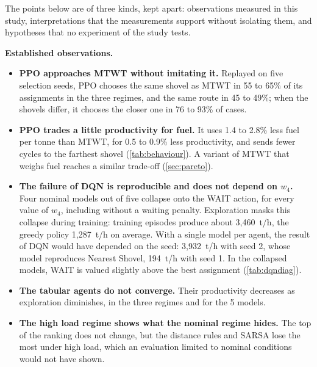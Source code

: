 \documentclass[11pt,a4paper]{article}
\newif\ifcorrmarks
\newenvironment{corrbloc}{\par\ifcorrmarks\color{corrcolor}\fi}{\par}
\begin{document}
\begin{corrbloc}
The points below are of three kinds, kept apart: observations measured in this study, interpretations that the measurements support without isolating them, and hypotheses that no experiment of the study tests.

\textbf{Established observations.}
\begin{itemize}
  \item \textbf{PPO approaches MTWT without imitating it.} Replayed on five selection seeds, PPO chooses the same shovel as MTWT in 55 to 65\% of its assignments in the three regimes, and the same route in 45 to 49\%; when the shovels differ, it chooses the closer one in 76 to 93\% of cases.
  \item \textbf{PPO trades a little productivity for fuel.} It uses 1.4 to 2.8\% less fuel per tonne than MTWT, for 0.5 to 0.9\% less productivity, and sends fewer cycles to the farthest shovel (\cref{tab:behaviour}). A variant of MTWT that weighs fuel reaches a similar trade-off (\cref{sec:pareto}).
  \item \textbf{The failure of DQN is reproducible and does not depend on $w_4$.} Four nominal models out of five collapse onto the WAIT action, for every value of $w_4$, including without a waiting penalty. Exploration masks this collapse during training: training episodes produce about 3,460~t/h, the greedy policy 1,287~t/h on average. With a single model per agent, the result of DQN would have depended on the seed: 3,932~t/h with seed 2, whose model reproduces Nearest Shovel, 194~t/h with seed 1. In the collapsed models, WAIT is valued slightly above the best assignment (\cref{tab:dqndiag}).
  \item \textbf{The tabular agents do not converge.} Their productivity decreases as exploration diminishes, in the three regimes and for the 5 models.
  \item \textbf{The high load regime shows what the nominal regime hides.} The top of the ranking does not change, but the distance rules and SARSA lose the most under high load, which an evaluation limited to nominal conditions would not have shown.
\end{itemize}


\end{corrbloc}
\end{document}

